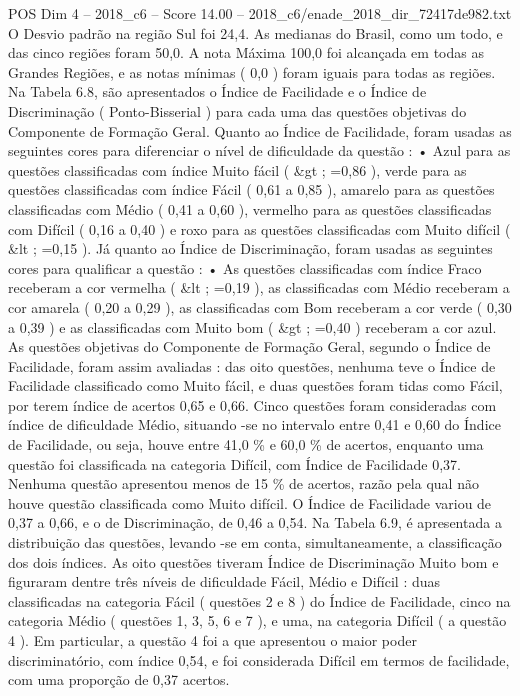 \begin{textsample}{POS Dim 4 – 2018\_c6 – Score 14.00 – 2018\_c6/enade\_2018\_dir\_72417de982.txt}
O Desvio padrão na região Sul foi 24,4.
As medianas do Brasil, como um todo, e das cinco regiões foram 50,0.
A nota Máxima 100,0 foi alcançada em todas as Grandes Regiões, e as notas mínimas ( 0,0 ) foram iguais para todas as regiões.
Na Tabela 6.8, são apresentados o Índice de Facilidade e o Índice de Discriminação ( Ponto-Bisserial ) para cada uma das questões objetivas do Componente de Formação Geral.
Quanto ao Índice de Facilidade, foram usadas as seguintes cores para diferenciar o nível de dificuldade da questão : • Azul para as questões classificadas com índice Muito fácil ( \&gt ; =0,86 ), verde para as questões classificadas com índice Fácil ( 0,61 a 0,85 ), amarelo para as questões classificadas com Médio ( 0,41 a 0,60 ), vermelho para as questões classificadas com Difícil ( 0,16 a 0,40 ) e roxo para as questões classificadas com Muito difícil ( \&lt ; =0,15 ).
Já quanto ao Índice de Discriminação, foram usadas as seguintes cores para qualificar a questão : • As questões classificadas com índice Fraco receberam a cor vermelha ( \&lt ; =0,19 ), as classificadas com Médio receberam a cor amarela ( 0,20 a 0,29 ), as classificadas com Bom receberam a cor verde ( 0,30 a 0,39 ) e as classificadas com Muito bom ( \&gt ; =0,40 ) receberam a cor azul.
As questões objetivas do Componente de Formação Geral, segundo o Índice de Facilidade, foram assim avaliadas : das oito questões, nenhuma teve o Índice de Facilidade classificado como Muito fácil, e duas questões foram tidas como Fácil, por terem índice de acertos 0,65 e 0,66.
Cinco questões foram consideradas com índice de dificuldade Médio, situando -se no intervalo entre 0,41 e 0,60 do Índice de Facilidade, ou seja, houve entre 41,0 \% e 60,0 \% de acertos, enquanto uma questão foi classificada na categoria Difícil, com Índice de Facilidade 0,37.
Nenhuma questão apresentou menos de 15 \% de acertos, razão pela qual não houve questão classificada como Muito difícil.
O Índice de Facilidade variou de 0,37 a 0,66, e o de Discriminação, de 0,46 a 0,54.
Na Tabela 6.9, é apresentada a distribuição das questões, levando -se em conta, simultaneamente, a classificação dos dois índices.
As oito questões tiveram Índice de Discriminação Muito bom e figuraram dentre três níveis de dificuldade Fácil, Médio e Difícil : duas classificadas na categoria Fácil ( questões 2 e 8 ) do Índice de Facilidade, cinco na categoria Médio ( questões 1, 3, 5, 6 e 7 ), e uma, na categoria Difícil ( a questão 4 ).
Em particular, a questão 4 foi a que apresentou o maior poder discriminatório, com índice 0,54, e foi considerada Difícil em termos de facilidade, com uma proporção de 0,37 acertos.

\end{textsample}
